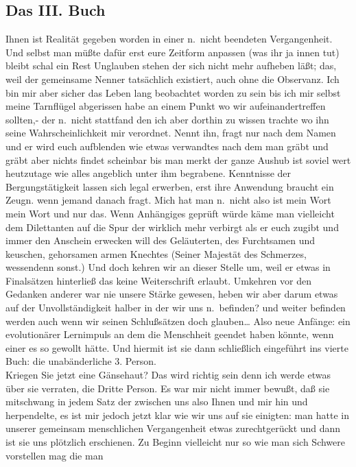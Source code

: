 \documentclass[
]{article}
\author{}
\date{\vspace{-2.5em}}
\begin{document}
\subsection{Das III. Buch}\label{das-iii.-buch}

Ihnen ist Realität gegeben worden in einer n.~nicht beendeten
Vergangenheit. Und selbst man müßte dafür erst eure Zeitform anpassen
(was ihr ja innen tut) bleibt schal ein Rest Unglauben stehen der sich
nicht mehr aufheben läßt; das, weil der gemeinsame Nenner tatsächlich
existiert, auch ohne die Observanz. Ich bin mir aber sicher das Leben
lang beobachtet worden zu sein bis ich mir selbst meine Tarnflügel
abgerissen habe an einem Punkt wo wir aufeinandertreffen sollten,- der
n.~nicht stattfand den ich aber dorthin zu wissen trachte wo ihn seine
Wahrscheinlichkeit mir verordnet. Nennt ihn, fragt nur nach dem Namen
und er wird euch aufblenden wie etwas verwandtes nach dem man gräbt und
gräbt aber nichts findet scheinbar bis man merkt der ganze Aushub ist
soviel wert heutzutage wie alles angeblich unter ihm begrabene.
Kenntnisse der Bergungstätigkeit lassen sich legal erwerben, erst ihre
Anwendung braucht ein Zeugn. wenn jemand danach fragt. Mich hat man
n.~nicht also ist mein Wort mein Wort und nur das. Wenn Anhängiges
geprüft würde käme man vielleicht dem Dilettanten auf die Spur der
wirklich mehr verbirgt als er euch zugibt und immer den Anschein
erwecken will des Geläuterten, des Furchtsamen und keuschen, gehorsamen
armen Knechtes (Seiner Majestät des Schmerzes, wessendenn sonst.) Und
doch kehren wir an dieser Stelle um, weil er etwas in Finalsätzen
hinterließ das keine Weiterschrift erlaubt. Umkehren vor den Gedanken
anderer war nie unsere Stärke gewesen, heben wir aber darum etwas auf
der Unvollständigkeit halber in der wir uns n.~befinden? und weiter
befinden werden auch wenn wir seinen Schlußsätzen doch glauben\ldots{}
Also neue Anfänge: ein evolutionärer Lernimpuls an dem die Menschheit
geendet haben könnte, wenn einer es so gewollt hätte. Und hiermit ist
sie dann schließlich eingeführt ins vierte Buch: die unabänderliche 3.
Person.\\
Kriegen Sie jetzt eine Gänsehaut? Das wird richtig sein denn ich werde
etwas über sie verraten, die Dritte Person. Es war mir nicht immer
bewußt, daß sie mitschwang in jedem Satz der zwischen uns also Ihnen und
mir hin und herpendelte, es ist mir jedoch jetzt klar wie wir uns auf
sie einigten: man hatte in unserer gemeinsam menschlichen Vergangenheit
etwas zurechtgerückt und dann ist sie uns plötzlich erschienen. Zu
Beginn vielleicht nur so wie man sich Schwere vorstellen mag die man
\end{document}
